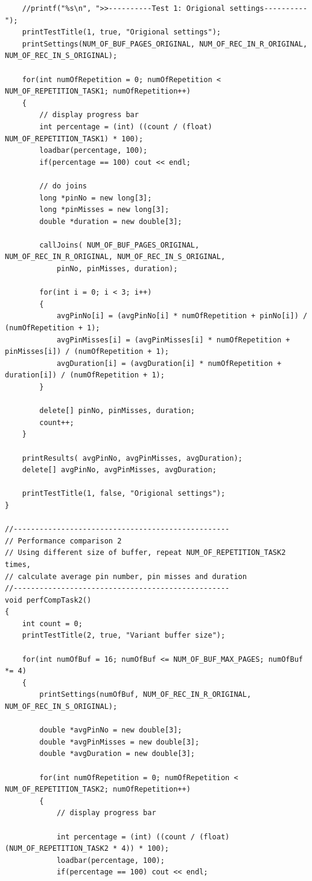 \documentclass{article}
\begin{document}
\begin{lstlisting}
	//printf("%s\n", ">>----------Test 1: Origional settings----------");
	printTestTitle(1, true, "Origional settings");
	printSettings(NUM_OF_BUF_PAGES_ORIGINAL, NUM_OF_REC_IN_R_ORIGINAL, NUM_OF_REC_IN_S_ORIGINAL);

	for(int numOfRepetition = 0; numOfRepetition < NUM_OF_REPETITION_TASK1; numOfRepetition++)
	{
		// display progress bar
		int percentage = (int) ((count / (float) NUM_OF_REPETITION_TASK1) * 100);
		loadbar(percentage, 100);
		if(percentage == 100) cout << endl;

		// do joins
		long *pinNo = new long[3];
		long *pinMisses = new long[3];
		double *duration = new double[3];

		callJoins( NUM_OF_BUF_PAGES_ORIGINAL, NUM_OF_REC_IN_R_ORIGINAL, NUM_OF_REC_IN_S_ORIGINAL, 
			pinNo, pinMisses, duration);

		for(int i = 0; i < 3; i++)
		{
			avgPinNo[i] = (avgPinNo[i] * numOfRepetition + pinNo[i]) / (numOfRepetition + 1);
			avgPinMisses[i] = (avgPinMisses[i] * numOfRepetition + pinMisses[i]) / (numOfRepetition + 1);
			avgDuration[i] = (avgDuration[i] * numOfRepetition + duration[i]) / (numOfRepetition + 1);
		}

		delete[] pinNo, pinMisses, duration;
		count++;
	}

	printResults( avgPinNo, avgPinMisses, avgDuration);
	delete[] avgPinNo, avgPinMisses, avgDuration;
	
	printTestTitle(1, false, "Origional settings");
}

//--------------------------------------------------
// Performance comparison 2
// Using different size of buffer, repeat NUM_OF_REPETITION_TASK2 times, 
// calculate average pin number, pin misses and duration
//-------------------------------------------------- 
void perfCompTask2()
{
	int count = 0;
	printTestTitle(2, true, "Variant buffer size");

	for(int numOfBuf = 16; numOfBuf <= NUM_OF_BUF_MAX_PAGES; numOfBuf *= 4)
	{
		printSettings(numOfBuf, NUM_OF_REC_IN_R_ORIGINAL, NUM_OF_REC_IN_S_ORIGINAL);

		double *avgPinNo = new double[3];
		double *avgPinMisses = new double[3];
		double *avgDuration = new double[3];

		for(int numOfRepetition = 0; numOfRepetition < NUM_OF_REPETITION_TASK2; numOfRepetition++)
		{
			// display progress bar
			
			int percentage = (int) ((count / (float) (NUM_OF_REPETITION_TASK2 * 4)) * 100);
			loadbar(percentage, 100);
			if(percentage == 100) cout << endl;


\end{lstlisting}
\end{document}
